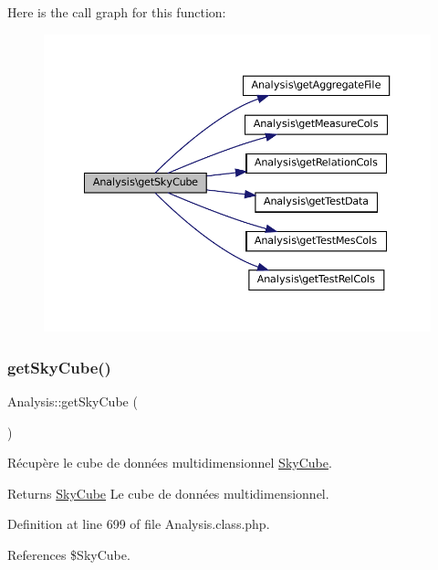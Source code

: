 Here is the call graph for this function\+:\nopagebreak
\begin{figure}[H]
\begin{center}
\leavevmode
\includegraphics[width=350pt]{class_analysis_aad6affe3bbce3e477cf3b33933f492d1_cgraph}
\end{center}
\end{figure}
\mbox{\label{class_analysis_a19f2ae7fb1a840da628415f3f86a748a}} 
\subsubsection{\texorpdfstring{get\+Sky\+Cube()}{getSkyCube()}\hspace{0.1cm}{\footnotesize\ttfamily [2/2]}}
{\footnotesize\ttfamily Analysis\+::get\+Sky\+Cube (\begin{DoxyParamCaption}{ }\end{DoxyParamCaption})}

Récupère le cube de données multidimensionnel \hyperlink{class_sky_cube}{Sky\+Cube}.

\begin{DoxyReturn}{Returns}
\hyperlink{class_sky_cube}{Sky\+Cube} Le cube de données multidimensionnel. 
\end{DoxyReturn}


Definition at line 699 of file Analysis.\+class.\+php.



References \$\+Sky\+Cube.



